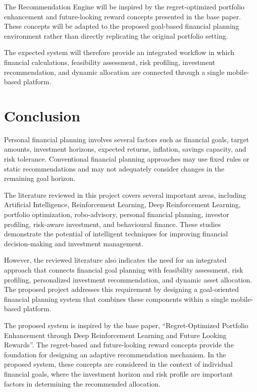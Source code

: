 The Recommendation Engine will be inspired by the regret-optimized portfolio enhancement and future-looking reward concepts presented in the base paper. These concepts will be adapted to the proposed goal-based financial planning environment rather than directly replicating the original portfolio setting.

The expected system will therefore provide an integrated workflow in which financial calculations, feasibility assessment, risk profiling, investment recommendation, and dynamic allocation are connected through a single mobile-based platform.

\section{Conclusion}
Personal financial planning involves several factors such as financial goals, target amounts, investment horizons, expected returns, inflation, savings capacity, and risk tolerance. Conventional financial planning approaches may use fixed rules or static recommendations and may not adequately consider changes in the remaining goal horizon.

The literature reviewed in this project covers several important areas, including Artificial Intelligence, Reinforcement Learning, Deep Reinforcement Learning, portfolio optimization, robo-advisory, personal financial planning, investor profiling, risk-aware investment, and behavioural finance. These studies demonstrate the potential of intelligent techniques for improving financial decision-making and investment management.

However, the reviewed literature also indicates the need for an integrated approach that connects financial goal planning with feasibility assessment, risk profiling, personalized investment recommendation, and dynamic asset allocation. The proposed project addresses this requirement by designing a goal-oriented financial planning system that combines these components within a single mobile-based platform.

The proposed system is inspired by the base paper, ``Regret-Optimized Portfolio Enhancement through Deep Reinforcement Learning and Future Looking Rewards''. The regret-based and future-looking reward concepts provide the foundation for designing an adaptive recommendation mechanism. In the proposed system, these concepts are considered in the context of individual financial goals, where the investment horizon and risk profile are important factors in determining the recommended allocation.

